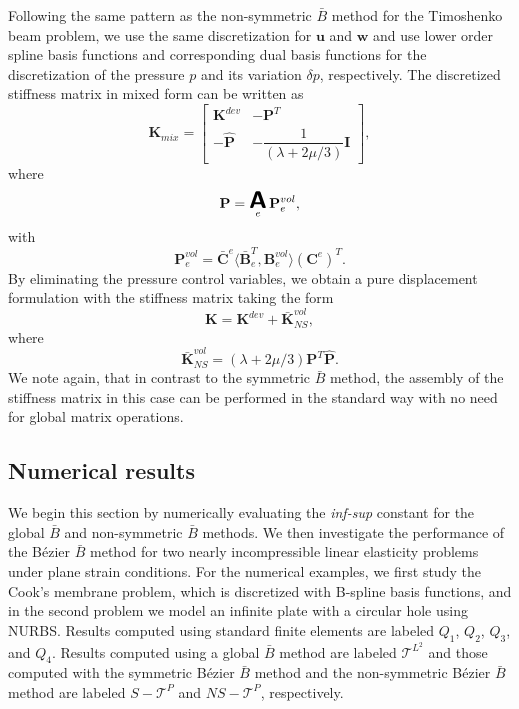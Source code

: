 Following the same pattern as the non-symmetric \Bezier $\bar{B}$ method for the Timoshenko beam problem, we use the same discretization for $\mathbf{u}$ and $\mathbf{w}$ and use lower order spline basis functions and corresponding dual basis functions for the discretization of the pressure $p$ and its variation $\delta{p}$, respectively. The discretized stiffness matrix in mixed form can be written as
\begin{equation}
    \mathbf{K}_{mix}=
    \begin{bmatrix}
        \mathbf{K}^{dev}  & -\mathbf{P}^{T}                        \\
        -\hat{\mathbf{P}} & -\dfrac{1}{(\lambda+2\mu/3)}\mathbf{I}
    \end{bmatrix},
\end{equation}
{where}
\begin{equation}
    \mathbf{P}=\A_e\mathbf{P}_e^{vol},
\end{equation}
with
\begin{equation}
    \mathbf{P}_e^{vol}=\bar{\mathbf{C}}^e\langle{\bar{\mathbf{B}}_e^T,\mathbf{B}^{vol}_e}\rangle(\mathbf{C}^e)^T.
\end{equation}
By eliminating the pressure control variables, we obtain a pure displacement formulation with the stiffness matrix taking the form
\begin{equation}
    \mathbf{K} = \mathbf{K}^{dev} + \bar{\mathbf{K}}^{vol}_{NS},
\end{equation}
where
\begin{equation}
    \bar{\mathbf{K}}^{vol}_{NS}=(\lambda+2\mu/3){\mathbf{P}}^T\hat{\mathbf{P}}.
\end{equation}
We note again, that in contrast to the symmetric \Bezier $\bar{B}$ method, the assembly of the stiffness matrix in this case can be performed in the standard way with no need for global matrix operations.

\subsection{Numerical results}
{We begin this section by numerically evaluating the \textit{inf-sup} constant for the global $\bar{B}$ and non-symmetric \Bezier $\bar{B}$ methods.}
We then investigate the performance of the B\'{e}zier $\bar{B}$ method for two nearly incompressible linear elasticity problems under plane strain conditions. {For the numerical examples,} we first study the Cook's membrane problem, which is discretized with B-spline basis functions, and in the second problem we model an infinite plate with a circular hole using NURBS. Results computed using standard finite elements are labeled $Q_1$, $Q_2$, $Q_3$, and $Q_4$. Results computed using a global $\bar{B}$ method are labeled $\mathcal{T}^{L^2}$ and those computed with the {symmetric} B\'ezier $\bar{B}$ method and the {non-symmetric B\'ezier $\bar{B}$ method} are labeled $S-\mathcal{T}^{P}$ and $NS-\mathcal{T}^{P}$, respectively.

